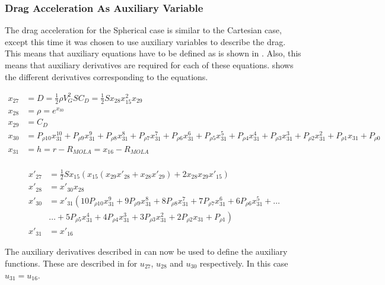  
 \subsubsection{Drag Acceleration As Auxiliary Variable}
 \label{subsubsec:tsiDragAuxE}
The drag acceleration for the Spherical case is similar to the Cartesian case, except this time it was chosen to use auxiliary variables to describe the drag. This means that auxiliary equations have to be defined as is shown in . Also, this means that auxiliary derivatives are required for each of these equations.  shows the different derivatives corresponding to the equations.
 
 \begin{equation} \label{eq:dragAux}
\begin{split}
x_{27} &= D = \frac{1}{2}\rho V_{G}^{2}SC_{D} = \frac{1}{2}Sx_{28}x_{15}^{2}x_{29}\\
x_{28} &= \rho = e^{x_{30}} \\
x_{29} &= C_{D} \\
x_{30} &= P_{\rho 10}x_{31}^{10}+P_{\rho 9}x_{31}^{9}+P_{\rho 8}x_{31}^{8}+P_{\rho 7}x_{31}^{7}+P_{\rho 6}x_{31}^{6}+P_{\rho 5}x_{31}^{5}+P_{\rho 4}x_{31}^{4}+P_{\rho 3}x_{31}^{3}+P_{\rho 2}x_{31}^{2}+P_{\rho 1}x_{31}+P_{\rho 0} \\
x_{31} &= h = r-R_{MOLA} = x_{16}-R_{MOLA} \\
\end{split}
\end{equation}

 \begin{equation} \label{eq:dragDerAux}
\begin{split}
x'_{27} &= \frac{1}{2}Sx_{15}\left(x_{15} \left(x_{29}x'_{28}+x_{28}x'_{29}\right)+2x_{28}x_{29}x'_{15}\right) \\
x'_{28} &= x'_{30}x_{28} \\
x'_{30} &=x'_{31} \left(10 P_{\rho 10}x_{31}^{9}+9 P_{\rho 9}x_{31}^{8}+8 P_{\rho 8}x_{31}^{7}+7 P_{\rho 7}x_{31}^{6}+6 P_{\rho 6}x_{31}^{5}+\dots \right. \\
&  \left. \dotsc +5 P_{\rho 5}x_{31}^{4}+4 P_{\rho 4}x_{31}^{3}+3 P_{\rho 3}x_{31}^{2}+2 P_{\rho 2}x_{31}+P_{\rho 1}\right) \\
x'_{31} &= x'_{16}
\end{split}
\end{equation}

\noindent
The auxiliary derivatives described in  can now be used to define the auxiliary functions. These are described in  for $u_{27}$, $u_{28}$ and $u_{30}$ respectively. In this case $u_{31}=u_{16}$.

